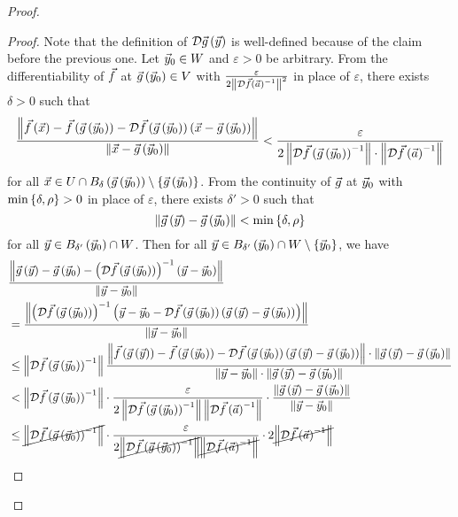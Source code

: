 \documentclass[main.tex]{subfiles}
\begin{document}
\begin{proof}
    \begin{proof}
        Note that the definition of $\mathcal{D}\vec{g}\left( \vec{y} \right)$ is well-defined because of the claim before the previous one. Let $\vec{y}_0\in W$ and $\varepsilon > 0$ be arbitrary. From the differentiability of $\vec{f}$ at $\vec{g}\left( \vec{y}_0 \right)\in V$ with $\frac{\varepsilon}{2\left\lVert \mathcal{D}\vec{f}\left( \vec{a} \right)^{-1} \right\rVert^2}$ in place of $\varepsilon$, there exists $\delta > 0$ such that
        \[\frac{\left\lVert \vec{f}\left( \vec{x} \right) - \vec{f}\left( \vec{g}\left( \vec{y}_0 \right) \right) - \mathcal{D}\vec{f}\left( \vec{g}\left( \vec{y}_0 \right) \right)\left( \vec{x} - \vec{g}\left( \vec{y}_0 \right) \right) \right\rVert}{\left\lVert \vec{x} - \vec{g}\left( \vec{y}_0 \right) \right\rVert} < \frac{\varepsilon}{2\left\lVert \mathcal{D}\vec{f}\left( \vec{g}\left( \vec{y}_0 \right) \right)^{-1} \right\rVert \cdot \left\lVert \mathcal{D}\vec{f}\left( \vec{a} \right)^{-1} \right\rVert}\]
        for all $\vec{x}\in U \cap B_\delta\left( \vec{g}\left( \vec{y}_0 \right) \right) \setminus \left\{ \vec{g}\left( \vec{y}_0 \right) \right\}$. From the continuity of $\vec{g}$ at $\vec{y}_0$ with $\min\left\{ \delta, \rho \right\} > 0$ in place of $\varepsilon$, there exists $\delta' > 0$ such that
        \[\left\lVert \vec{g}\left( \vec{y} \right) - \vec{g}\left( \vec{y}_0 \right) \right\rVert < \min\left\{ \delta, \rho \right\}\]
        for all $\vec{y}\in B_{\delta'}\left( \vec{y}_0 \right) \cap W$. Then for all $\vec{y}\in B_{\delta'}\left( \vec{y}_0 \right) \cap W \setminus \left\{ \vec{y}_0 \right\}$, we have
        \begin{align*}
            &\frac{\norm{\vg\parens{\vy} - \vg\parens{\vy_0} - \parens{\mathcal{D}\vf\parens{\vg\parens{\vy_0}}}^{-1}\parens{\vy - \vy_0}}}{\norm{\vy - \vy_0}} \\
            &= \frac{\norm{\parens{\mathcal{D}\vf\parens{\vg\parens{\vy_0}}}^{-1}\parens{\vy - \vy_0 - \mathcal{D}\vf\parens{\vg\parens{\vy_0}}\parens{\vg\parens{\vy} - \vg\parens{\vy_0}}}}}{\norm{\vy - \vy_0}} \\
            &\le \norm{\mathcal{D}\vf\parens{\vg\parens{\vy_0}}^{-1}}\frac{\norm{\vf\parens{\vg\parens{\vy}} - \vf\parens{\vg\parens{\vy_0}} - \mathcal{D}\vf\parens{\vg\parens{\vy_0}}\parens{\vg\parens{\vy} - \vg\parens{\vy_0}}}\cdot \norm{\vg\parens{\vy} - \vg\parens{\vy_0}}}{\norm{\vy - \vy_0}\cdot \norm{\vg\parens{\vy} - \vg\parens{\vy_0}}} \\
            &< \norm{\mathcal{D}\vf\parens{\vg\parens{\vy_0}}^{-1}} \cdot \frac{\varepsilon}{2\norm{\mathcal{D}\vf\parens{\vg\parens{\vy_0}}^{-1}}\norm{\mathcal{D}\vf\parens{\va}^{-1}}} \cdot \frac{\norm{\vg\parens{\vy} - \vg\parens{\vy_0}}}{\norm{\vy - \vy_0}} \\
            &\le \cancel{\norm{\mathcal{D}\vf\parens{\vg\parens{\vy_0}}^{-1}}} \cdot \frac{\varepsilon}{2\cancel{\norm{\mathcal{D}\vf\parens{\vg\parens{\vy_0}}^{-1}}}\cancel{\norm{\mathcal{D}\vf\parens{\va}^{-1}}}} \cdot 2\cancel{\norm{\mathcal{D}\vf\parens{\va}^{-1}}} \\

\end{align*}
\end{proof}
\end{proof}
\end{document}
